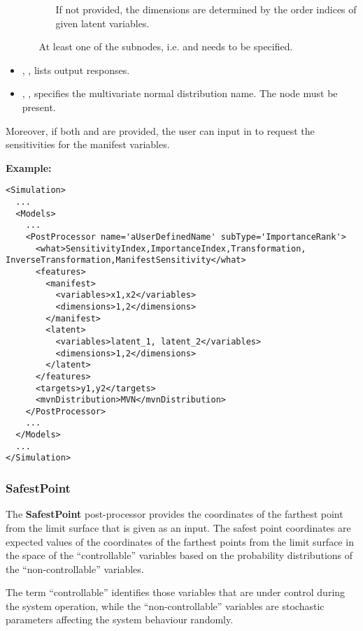 \begin{itemize}
\begin{itemize}
\begin{itemize}
          If not provided, the dimensions are determined by the order indices of given latent variables.
        \end{itemize}
      \nb At least one of the subnodes, i.e.  and  needs to be specified.
    \end{itemize}
  \item {}, , lists output responses.
  \item {}, , specifies the
  multivariate normal distribution name. The  node must be present.
\end{itemize}
  Moreover, if both  and  are provided, the user can input  in 
  to request the sensitivities for the manifest variables.

\textbf{Example:}
\begin{lstlisting}[style=XML,morekeywords={name,subType,debug}]
<Simulation>
  ...
  <Models>
    ...
    <PostProcessor name='aUserDefinedName' subType='ImportanceRank'>
      <what>SensitivityIndex,ImportanceIndex,Transformation, InverseTransformation,ManifestSensitivity</what>
      <features>
        <manifest>
          <variables>x1,x2</variables>
          <dimensions>1,2</dimensions>
        </manifest>
        <latent>
          <variables>latent_1, latent_2</variables>
          <dimensions>1,2</dimensions>
        </latent>
      </features>
      <targets>y1,y2</targets>
      <mvnDistribution>MVN</mvnDistribution>
    </PostProcessor>
    ...
  </Models>
  ...
</Simulation>
\end{lstlisting}

\subsubsection{SafestPoint}
\label{SafestPoint}
The \textbf{SafestPoint} post-processor provides the coordinates of the farthest
point from the limit surface that is given as an input.
%
The safest point coordinates are expected values of the coordinates of the
farthest points from the limit surface in the space of the ``controllable''
variables based on the probability distributions of the ``non-controllable''
variables.

The term ``controllable'' identifies those variables that are under control
during the system operation, while the ``non-controllable'' variables are
stochastic parameters affecting the system behaviour randomly.

